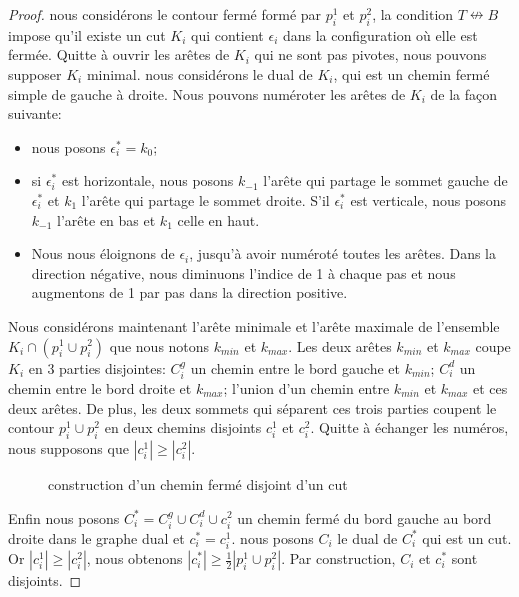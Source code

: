 \documentclass[titlepage,a4paper,12pt]{article}
\begin{document}
\begin{proof}
nous considérons le contour fermé formé par $p_i^1$ et $p_i^2$, la condition $T\nleftrightarrow B$ impose qu'il existe un cut $K_i$ qui contient $\epsilon_i$ dans la configuration où elle est fermée. Quitte à ouvrir les arêtes de $K_i$ qui ne sont pas pivotes, nous pouvons supposer $K_i$ minimal. nous considérons le dual de $K_i$, qui est un chemin fermé simple de gauche à droite. Nous pouvons numéroter les arêtes de $K_i$ de la façon suivante:
\begin{itemize}
\item nous posons $\epsilon^*_i = k_0$;
\item si $\epsilon^*_i$ est horizontale, nous posons $k_{-1}$ l'arête qui partage le sommet gauche de $\epsilon^*_i$ et $k_1$ l'arête qui partage le sommet droite. S'il $\epsilon_i^*$ est verticale, nous posons $k_{-1}$ l'arête en bas et $k_1$ celle en haut.
\item Nous nous éloignons de $\epsilon_i$, jusqu'à avoir numéroté toutes les arêtes. Dans la direction négative, nous diminuons l'indice de 1 à chaque pas et nous augmentons de 1 par pas dans la direction positive.
\end{itemize}

Nous considérons maintenant l'arête minimale et l'arête maximale de l'ensemble $K_i\cap (p_i^1\cup p_i^2)$ que nous notons $k_{min}$ et $k_{max}$. Les deux arêtes $k_{min}$ et $k_{max}$ coupe $K_i$ en 3 parties disjointes: $C^g_i$ un chemin entre le bord gauche et $k_{min}$; $C^d_i$ un chemin entre le bord droite et $k_{max}$; l'union d'un chemin entre $k_{min}$ et $k_{max}$ et ces deux arêtes. De plus, les deux sommets qui séparent ces trois parties coupent le contour $p_i^1\cup p_i^2$ en deux chemins disjoints $c_i^1$ et $c_i^2$. Quitte à échanger les numéros, nous supposons que $|c_i^1| \geqslant |c_i^2|$.
\begin{figure}[h]
\center
{}
\caption{construction d'un chemin fermé disjoint d'un cut}
\end{figure}

Enfin nous posons $C^*_i = C^g_i \cup C^d_i \cup c_i^2$ un chemin fermé du bord gauche au bord droite dans le graphe dual et $c_i^* = c_i^1$. nous posons $C_i$ le dual de $C^*_i$ qui est un cut. Or $|c_i^1| \geqslant |c_i^2|$, nous obtenons $|c^*_i| \geqslant \frac{1}{2}|p_i^1\cup p_i^2|$. Par construction, $C_i$ et $c_i^*$ sont disjoints.
\end{proof}
\end{document}
